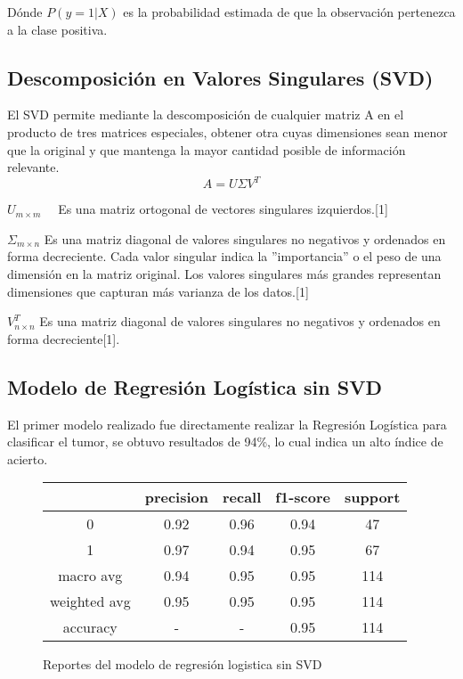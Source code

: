 \documentclass[a4paper,10pt,twocolumn]{article}
\begin{document}
Dónde $P(y=1|X)$ es la probabilidad estimada de que la observación pertenezca a la clase positiva.
\subsection{Descomposición en Valores Singulares (SVD)}
El SVD permite mediante la descomposición de cualquier matriz A en el producto de tres matrices especiales, obtener otra cuyas dimensiones sean menor que la original y que mantenga la mayor cantidad posible de información relevante.
\[
    A = U \Sigma V^T
\]

\begin{description}
			\item $U_{m \times m} \quad$ Es una matriz ortogonal de vectores singulares izquierdos.[1]
			\item $\Sigma_{m \times n}$ Es una matriz diagonal de valores singulares no negativos y ordenados en forma decreciente. Cada valor singular indica la ”importancia” o el peso de una dimensión en la matriz original. Los valores singulares más grandes representan dimensiones que capturan más varianza de los datos.[1]
            \item $V^T_{n \times n}$ Es una matriz diagonal de valores singulares no negativos y ordenados en forma decreciente[1].\\
		\end{description}

\subsection{Modelo de Regresión Logística sin SVD}
El primer modelo realizado fue directamente realizar la Regresión Logística para clasificar el tumor, se obtuvo resultados de 94\%, lo cual indica un alto índice de acierto. 
	\begin{figure}[h!]%
		\begin{center}
			\begin{tabular}{|c|c|c|c|c|} \hline
			 			& precision 	& recall& f1-score &support	\\ \hline
			0 			&  	0.92		& 0.96 	&0.94	&47	\\ \hline
			1			& 	0.97		& 0.94	&0.95&67	\\ \hline
    
   macro avg 			&  	0.94		& 0.95 	&0.95	&114	\\ \hline
			weighted avg			& 0.95	& 0.95	&0.95&114	\\ \hline
   accuracy &- &-& 0.95&114\\ \hline
			\end{tabular}
		\caption{Reportes del modelo de regresión logistica sin SVD \label{fig:ex}}
		\end{center}
		\end{figure}
   
\end{document}
